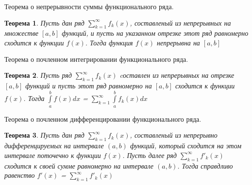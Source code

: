 \documentclass[12pt, a4paper]{article}
\newtheorem{thm}{Теорема}
\newenvironment{field}{}{\newpage}
\newif\ifnote
\newenvironment{note}{\notetrue}{\notefalse}
\begin{document}
\begin{note}
\begin{field}
Теорема о непрерывности суммы функционального ряда.
\end{field}
\begin{field}
\begin{thm}
	Пусть дан ряд $\sum\limits_{k=1}^{\infty}f_k(x)$, составленый из непрерывных на множестве $[a, b]$ функций, и пусть на указанном отрезке этот ряд равномерно сходится к функции $f(x)$. Тогда функция $f(x)$ непрерывна на $[a, b]$
\end{thm}

\end{field}
\end{note}

\begin{note}
\begin{field}
Теорема о почленном интегрировании функционального ряда.
\end{field}
\begin{field}
\begin{thm}
Пусть ряд $\sum\limits_{k=1}^{\infty}f_k(x)$ cоставлен из непрерывных на отрезке $[a, b]$ функций и пусть этот ряд равномерно на $[a, b]$ сходится к функции $f(x)$. Тогда $\int\limits_{a}^{b}f(x)dx$ = $\sum\limits_{k=1}^{\infty}\int\limits_{a}^{b}f_k(x)dx$
\end{thm}

\end{field}
\end{note}

\begin{note}
\begin{field}
Теорема о почленном дифференцировании функционального ряда.
\end{field}
\begin{field}
\begin{thm}
Пусть дан ряд $\sum\limits_{k=1}^{\infty}f_k(x)$, составленый из непрерывно дифференцируемых на интервале $(a, b)$ функций, который сходится на этом интервале поточечно к функции $f(x)$. Пусть далее ряд $\sum\limits_{k=1}^{\infty}f'_k(x)$ сходится к своей сумме равномерно на интервале $(a, b)$. Тогда справдливо равенство $f'(x)$ = $\sum\limits_{k=1}^{\infty}f'_k(x)$
\end{thm}


\end{field}
\end{note}
\end{document}
